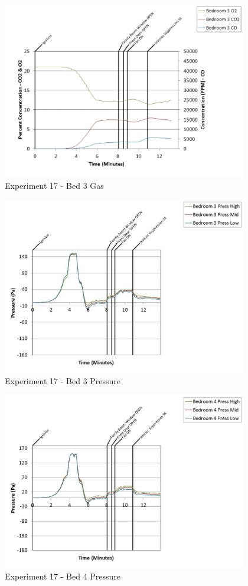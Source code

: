 \documentclass{article}
\begin{document}
\begin{appendices}
	\clearpage

	\begin{figure}[h!]
		\centering
		\includegraphics[height=3.05in]{0_Images/Results_Charts/Exp_17_Charts/Bed3Gas.pdf}
		\caption{Experiment 17 - Bed 3 Gas}
	\end{figure}
 

	\begin{figure}[h!]
		\centering
		\includegraphics[height=3.05in]{0_Images/Results_Charts/Exp_17_Charts/Bed3Pressure.pdf}
		\caption{Experiment 17 - Bed 3 Pressure}
	\end{figure}
 
	\clearpage

	\begin{figure}[h!]
		\centering
		\includegraphics[height=3.05in]{0_Images/Results_Charts/Exp_17_Charts/Bed4Pressure.pdf}
		\caption{Experiment 17 - Bed 4 Pressure}
	\end{figure}
 


\end{appendices}
\end{document}
